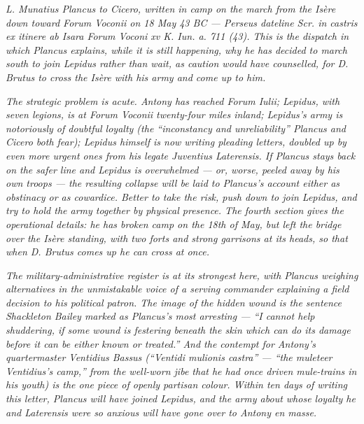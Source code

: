 
\textit{L. Munatius Plancus to Cicero, written in camp on the
march from the Is\`ere down toward Forum Voconii on 18 May
43 BC --- Perseus dateline \textit{Scr. in castris ex itinere
ab Isara Forum Voconi xv K. Iun. a. 711 (43)}. This is the
dispatch in which Plancus explains, while it is still
happening, why he has decided to march south to join Lepidus
rather than wait, as caution would have counselled, for D.
Brutus to cross the Is\`ere with his army and come up to him.}

\textit{The strategic problem is acute. Antony has reached
Forum Iulii; Lepidus, with seven legions, is at Forum
Voconii twenty-four miles inland; Lepidus's army is
notoriously of doubtful loyalty (the ``inconstancy and
unreliability'' Plancus and Cicero both fear); Lepidus
himself is now writing pleading letters, doubled up by
even more urgent ones from his legate Juventius Laterensis.
If Plancus stays back on the safer line and Lepidus is
overwhelmed --- or, worse, peeled away by his own troops
--- the resulting collapse will be laid to Plancus's
account either as obstinacy or as cowardice. Better to
take the risk, push down to join Lepidus, and try to hold
the army together by physical presence. The fourth section
gives the operational details: he has broken camp on the
18th of May, but left the bridge over the Is\`ere standing,
with two forts and strong garrisons at its heads, so that
when D. Brutus comes up he can cross at once.}

\textit{The military-administrative register is at its
strongest here, with Plancus weighing alternatives in the
unmistakable voice of a serving commander explaining a
field decision to his political patron. The image of the
hidden wound is the sentence Shackleton Bailey marked as
Plancus's most arresting --- ``I cannot help shuddering,
if some wound is festering beneath the skin which can do
its damage before it can be either known or treated.''
And the contempt for Antony's quartermaster Ventidius
Bassus (``Ventidi mulionis castra'' --- ``the muleteer
Ventidius's camp,'' from the well-worn jibe that he had
once driven mule-trains in his youth) is the one piece
of openly partisan colour. Within ten days of writing this
letter, Plancus will have joined Lepidus, and the army
about whose loyalty he and Laterensis were so anxious
will have gone over to Antony en masse.}
